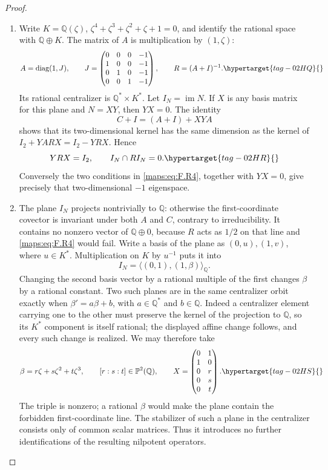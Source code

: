 \documentclass[11pt,a4paper]{article}
\numberwithin{equation}{section}
\theoremstyle{definition}
\begin{document}
\begin{proof}
\begin{enumerate}[label=\arabic*.]
\item Write $K=\mathbb Q(\zeta)$, $\zeta^4+\zeta^3+\zeta^2+
\zeta+1=0$, and identify the rational space with
$\mathbb Q\oplus K$.  The matrix of $A$ is multiplication by
$(1,\zeta)$:
\begin{equation}
 A=\operatorname{diag}(1,J),\qquad
 J=\begin{pmatrix}
 0&0&0&-1\\1&0&0&-1\\0&1&0&-1\\0&0&1&-1
 \end{pmatrix},\qquad R=(A+I)^{-1}.
 \hypertarget{tag-02HQ}{}\label{maps:eq:F.R3}
\end{equation}
Its rational centralizer is $\mathbb Q^*\times K^*$.
Let $I_N=\operatorname{im}N$.  If $X$ is any basis matrix
for this plane and $N=XY$, then $YX=0$.
The identity
\[
 C+I=(A+I)+XYA
\]
shows that its two-dimensional kernel has the same dimension
as the kernel of
$I_2+YARX=I_2-YRX$.  Hence
\begin{equation}
 YRX=I_2,
 \qquad I_N\cap RI_N=0.
 \hypertarget{tag-02HR}{}\label{maps:eq:F.R4}
\end{equation}
Conversely the two conditions in \eqref{maps:eq:F.R4}, together with
$YX=0$, give precisely that two-dimensional $-1$ eigenspace.

\item The plane $I_N$ projects nontrivially to $\mathbb Q$:
otherwise the first-coordinate covector is invariant under
both $A$ and $C$, contrary to irreducibility.
It contains no nonzero vector of $\mathbb Q\oplus0$,
because $R$ acts as $1/2$ on that line and \eqref{maps:eq:F.R4} would fail.
Write a basis of the plane as $(0,u),(1,v)$, where
$u\in K^*$.  Multiplication on $K$ by $u^{-1}$ puts it into
\[
 I_N=\langle(0,1),(1,\beta)\rangle_{\mathbb Q}.
\]
Changing the second basis vector by a rational multiple of
the first changes $\beta$ by a rational constant.
Two such planes are in the same centralizer orbit exactly
when $\beta'=a\beta+b$, with $a\in\mathbb Q^*$ and
$b\in\mathbb Q$.  Indeed a centralizer element carrying
one to the other must preserve the kernel of the projection
to $\mathbb Q$, so its $K^*$ component is itself rational;
the displayed affine change follows, and every such change
is realized.  We may therefore take
\begin{equation}
 \beta=r\zeta+s\zeta^2+t\zeta^3,
 \qquad [r:s:t]\in\mathbb P^2(\mathbb Q),
 \qquad
 X=\begin{pmatrix}0&1\\1&0\\0&r\\0&s\\0&t\end{pmatrix}.
 \hypertarget{tag-02HS}{}\label{maps:eq:F.R5}
\end{equation}
The triple is nonzero; a rational $\beta$ would make the
plane contain the forbidden first-coordinate line.
The stabilizer of such a plane in the centralizer consists
only of common scalar matrices.  Thus it introduces no
further identifications of the resulting nilpotent operators.


\end{enumerate}
\end{proof}
\end{document}
